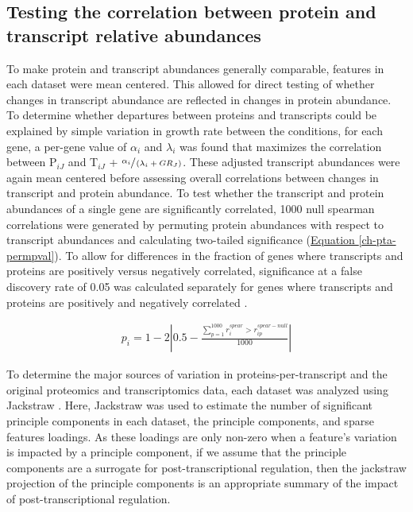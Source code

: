 \subsection{Testing the correlation between protein and transcript relative abundances}

To make protein and transcript abundances generally comparable, features in each dataset were mean centered. This allowed for direct testing of whether changes in transcript abundance are reflected in changes in protein abundance.  To determine whether departures between proteins and transcripts could be explained by simple variation in growth rate between the conditions, for each gene, a per-gene value of $\alpha_{i}$ and $\lambda_{i}$ was found that maximizes the correlation between P$_{iJ}$ and T$_{iJ}$ + $\sfrac{\alpha_{i}}{\left(\lambda_{i} + GR_{J}\right)}$.  These adjusted transcript abundances were again mean centered before assessing overall correlations between changes in transcript and protein abundance. To test whether the transcript and protein abundances of a single gene are significantly correlated, 1000 null spearman correlations were generated by permuting protein abundances with respect to transcript abundances and calculating two-tailed significance (\hyperref[ch-pta-permpval]{Equation \ref{ch-pta-permpval}}). To allow for differences in the fraction of genes where transcripts and proteins are positively versus negatively correlated, significance at a false discovery rate of 0.05 was calculated separately for genes where transcripts and proteins are positively and negatively correlated \cite{Storey:2003cj}.

\begin{align}
p_{i} = 1 - 2\left|0.5 - \frac{\sum_{p = 1}^{1000}r^{spear}_{i} > r_{ip}^{spear-null}}{1000}\label{ch-pta-permpval}\right|
\end{align}

To determine the major sources of variation in proteins-per-transcript and the original proteomics and transcriptomics data, each dataset was analyzed using Jackstraw \cite{Chung:2015bq}. Here, Jackstraw was used to estimate the number of significant principle components in each dataset, the principle components, and sparse features loadings. As these loadings are only non-zero when a feature's variation is impacted by a principle component, if we assume that the principle components are a surrogate for post-transcriptional regulation, then the jackstraw projection of the principle components is an appropriate summary of the impact of post-transcriptional regulation.

